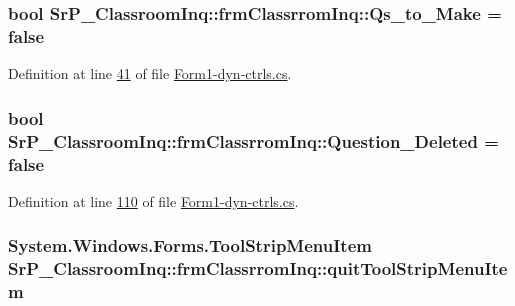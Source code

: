 \hypertarget{class_sr_p___classroom_inq_1_1frm_classrrom_inq_a74b0b2afc18cdf1d19dc415ab870e68b}{
\subsubsection[{\-Qs\-\_\-to\-\_\-\-Make}]{\setlength{\rightskip}{0pt plus 5cm}bool {\bf \-Sr\-P\-\_\-\-Classroom\-Inq\-::frm\-Classrrom\-Inq\-::\-Qs\-\_\-to\-\_\-\-Make} = false}}
\label{class_sr_p___classroom_inq_1_1frm_classrrom_inq_a74b0b2afc18cdf1d19dc415ab870e68b}


\-Definition at line \hyperlink{_form1-dyn-ctrls_8cs_source_l00041}{41} of file \hyperlink{_form1-dyn-ctrls_8cs_source}{\-Form1-\/dyn-\/ctrls.\-cs}.

\hypertarget{class_sr_p___classroom_inq_1_1frm_classrrom_inq_a8f54ae3a0ea7bb9dafed984a53155fd8}{
\subsubsection[{\-Question\-\_\-\-Deleted}]{\setlength{\rightskip}{0pt plus 5cm}bool {\bf \-Sr\-P\-\_\-\-Classroom\-Inq\-::frm\-Classrrom\-Inq\-::\-Question\-\_\-\-Deleted} = false}}
\label{class_sr_p___classroom_inq_1_1frm_classrrom_inq_a8f54ae3a0ea7bb9dafed984a53155fd8}


\-Definition at line \hyperlink{_form1-dyn-ctrls_8cs_source_l00110}{110} of file \hyperlink{_form1-dyn-ctrls_8cs_source}{\-Form1-\/dyn-\/ctrls.\-cs}.

\hypertarget{class_sr_p___classroom_inq_1_1frm_classrrom_inq_a7e4ada35eda1d7984167b62ab487ace7}{
\subsubsection[{quit\-Tool\-Strip\-Menu\-Item}]{\setlength{\rightskip}{0pt plus 5cm}\-System.\-Windows.\-Forms.\-Tool\-Strip\-Menu\-Item {\bf \-Sr\-P\-\_\-\-Classroom\-Inq\-::frm\-Classrrom\-Inq\-::quit\-Tool\-Strip\-Menu\-Item}}}
\label{class_sr_p___classroom_inq_1_1frm_classrrom_inq_a7e4ada35eda1d7984167b62ab487ace7}


